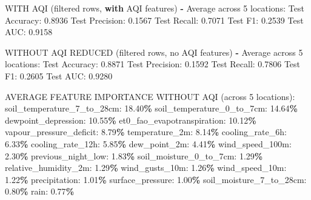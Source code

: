 \documentclass[
  letterpaper,
  DIV=11,
  numbers=noendperiod]{scrartcl}
\newenvironment{Shaded}{\begin{snugshade}}{\end{snugshade}}
\newcommand{\ControlFlowTok}[1]{\textcolor[rgb]{0.13,0.29,0.53}{\textbf{#1}}}
\newcommand{\DecValTok}[1]{\textcolor[rgb]{0.00,0.00,0.81}{#1}}
\newcommand{\FloatTok}[1]{\textcolor[rgb]{0.00,0.00,0.81}{#1}}
\newcommand{\NormalTok}[1]{#1}
\newcommand{\OperatorTok}[1]{\textcolor[rgb]{0.81,0.36,0.00}{\textbf{#1}}}
\begin{document}
\begin{Shaded}
\begin{Highlighting}[]
\NormalTok{WITH AQI (filtered rows, }\ControlFlowTok{with}\NormalTok{ AQI features) }\OperatorTok{{-}}\NormalTok{ Average across }\DecValTok{5}\NormalTok{ locations:}
\NormalTok{  Test Accuracy: }\FloatTok{0.8936}
\NormalTok{  Test Precision: }\FloatTok{0.1567}
\NormalTok{  Test Recall: }\FloatTok{0.7071}
\NormalTok{  Test F1: }\FloatTok{0.2539}
\NormalTok{  Test AUC: }\FloatTok{0.9158}

\NormalTok{WITHOUT AQI REDUCED (filtered rows, no AQI features) }\OperatorTok{{-}}\NormalTok{ Average across }\DecValTok{5}\NormalTok{ locations:}
\NormalTok{  Test Accuracy: }\FloatTok{0.8871}
\NormalTok{  Test Precision: }\FloatTok{0.1592}
\NormalTok{  Test Recall: }\FloatTok{0.7806}
\NormalTok{  Test F1: }\FloatTok{0.2605}
\NormalTok{  Test AUC: }\FloatTok{0.9280}

\NormalTok{AVERAGE FEATURE IMPORTANCE WITHOUT AQI (across }\DecValTok{5}\NormalTok{ locations):}
\NormalTok{  soil\_temperature\_7\_to\_28cm: }\FloatTok{18.40}\OperatorTok{\%}
\NormalTok{  soil\_temperature\_0\_to\_7cm: }\FloatTok{14.64}\OperatorTok{\%}
\NormalTok{  dewpoint\_depression: }\FloatTok{10.55}\OperatorTok{\%}
\NormalTok{  et0\_fao\_evapotranspiration: }\FloatTok{10.12}\OperatorTok{\%}
\NormalTok{  vapour\_pressure\_deficit: }\FloatTok{8.79}\OperatorTok{\%}
\NormalTok{  temperature\_2m: }\FloatTok{8.14}\OperatorTok{\%}
\NormalTok{  cooling\_rate\_6h: }\FloatTok{6.33}\OperatorTok{\%}
\NormalTok{  cooling\_rate\_12h: }\FloatTok{5.85}\OperatorTok{\%}
\NormalTok{  dew\_point\_2m: }\FloatTok{4.41}\OperatorTok{\%}
\NormalTok{  wind\_speed\_100m: }\FloatTok{2.30}\OperatorTok{\%}
\NormalTok{  previous\_night\_low: }\FloatTok{1.83}\OperatorTok{\%}
\NormalTok{  soil\_moisture\_0\_to\_7cm: }\FloatTok{1.29}\OperatorTok{\%}
\NormalTok{  relative\_humidity\_2m: }\FloatTok{1.29}\OperatorTok{\%}
\NormalTok{  wind\_gusts\_10m: }\FloatTok{1.26}\OperatorTok{\%}
\NormalTok{  wind\_speed\_10m: }\FloatTok{1.22}\OperatorTok{\%}
\NormalTok{  precipitation: }\FloatTok{1.01}\OperatorTok{\%}
\NormalTok{  surface\_pressure: }\FloatTok{1.00}\OperatorTok{\%}
\NormalTok{  soil\_moisture\_7\_to\_28cm: }\FloatTok{0.80}\OperatorTok{\%}
\NormalTok{  rain: }\FloatTok{0.77}\OperatorTok{\%}


\end{Highlighting}
\end{Shaded}
\end{document}
